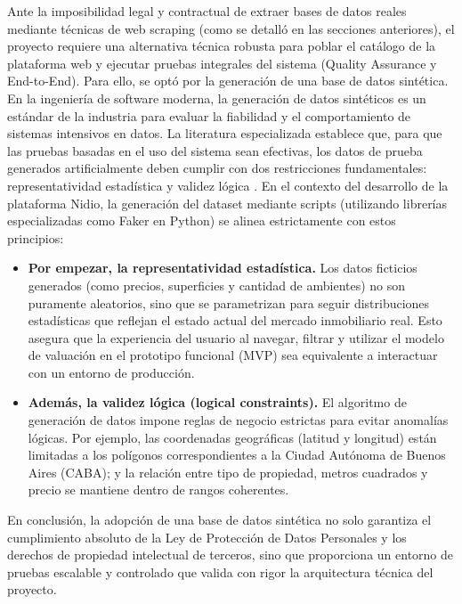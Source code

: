 Ante la imposibilidad legal y contractual de extraer bases de datos reales mediante técnicas de web scraping (como se detalló en las secciones anteriores), el proyecto requiere una alternativa técnica robusta para poblar el catálogo de la plataforma web y ejecutar pruebas integrales del sistema (Quality Assurance y End-to-End). Para ello, se optó por la generación de una base de datos sintética. En la ingeniería de software moderna, la generación de datos sintéticos es un estándar de la industria para evaluar la fiabilidad y el comportamiento de sistemas intensivos en datos. La literatura especializada establece que, para que las pruebas basadas en el uso del sistema sean efectivas, los datos de prueba generados artificialmente deben cumplir con dos restricciones fundamentales: representatividad estadística y validez lógica \parencite{SoltanaEtAl2017}. En el contexto del desarrollo de la plataforma Nidio, la generación del dataset mediante scripts (utilizando librerías especializadas como Faker en Python) se alinea estrictamente con estos principios:

\begin{itemize}
\item \textbf{Por empezar, la representatividad estadística.} Los datos ficticios generados (como precios, superficies y cantidad de ambientes) no son puramente aleatorios, sino que se parametrizan para seguir distribuciones estadísticas que reflejan el estado actual del mercado inmobiliario real. Esto asegura que la experiencia del usuario al navegar, filtrar y utilizar el modelo de valuación en el prototipo funcional (MVP) sea equivalente a interactuar con un entorno de producción.
\item \textbf{Además, la validez lógica (logical constraints).} El algoritmo de generación de datos impone reglas de negocio estrictas para evitar anomalías lógicas. Por ejemplo, las coordenadas geográficas (latitud y longitud) están limitadas a los polígonos correspondientes a la Ciudad Autónoma de Buenos Aires (CABA); y la relación entre tipo de propiedad, metros cuadrados y precio se mantiene dentro de rangos coherentes.
\end{itemize}

En conclusión, la adopción de una base de datos sintética no solo garantiza el cumplimiento absoluto de la Ley de Protección de Datos Personales y los derechos de propiedad intelectual de terceros, sino que proporciona un entorno de pruebas escalable y controlado que valida con rigor la arquitectura técnica del proyecto.

